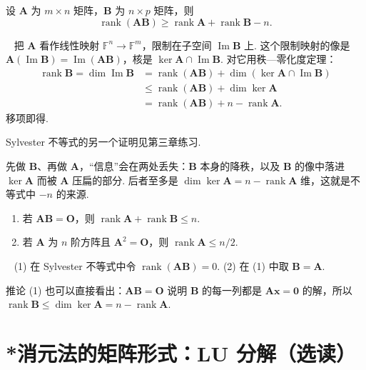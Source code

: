 \documentclass[lang=cn,10.5pt,scheme=chinese,toc=twocol,section,chinesefont=nofont,
twoside,citestyle=gb7714-2015,bibstyle=gb7714-2015]{elegantbook}
\newcommand{\vv}[1]{\boldsymbol{#1}}
\newcommand{\zero}{\boldsymbol{0}}          %
\numberwithin{equation}{section}   %
\newcommand{\rk}{\operatorname{rank}}       %
\newcommand{\imm}{\operatorname{Im}}        %
\newcommand*{\lnlabel}[1]{{\sffamily\bfseries\color{black}#1}}
\renewenvironment{proof}{%
	\par\noindent\lnlabel{\proofname}\;\ \color{black!90}\cfs}{\par}
\begin{document}
\begin{theorem}\label{thm:sylvester}
  设 $\vv A$ 为 $m\times n$ 矩阵，$\vv B$ 为 $n\times p$ 矩阵，则
  \[\rk(\vv{AB})\ge\rk\vv A+\rk\vv B-n.\]
\end{theorem}
\begin{proof}
  把 $\vv A$ 看作线性映射 $\mathbb{F}^n\to\mathbb{F}^m$，限制在子空间 $\imm\vv B$ 上. 这个限制映射的像是 $\vv A(\imm\vv B)=\imm(\vv{AB})$，核是 $\ker\vv A\cap\imm\vv B$. 对它用秩—零化度定理：
  \[
    \begin{aligned}
      \rk\vv B=\dim\imm\vv B & =\rk(\vv{AB})+\dim(\ker\vv A\cap\imm\vv B) \\
                             & \le\rk(\vv{AB})+\dim\ker\vv A              \\
                             & =\rk(\vv{AB})+n-\rk\vv A.
    \end{aligned}
  \]
  移项即得.
\end{proof}

Sylvester 不等式的另一个证明见第三章练习.

\begin{motivebox}
  先做 $\vv B$、再做 $\vv A$，“信息”会在两处丢失：$\vv B$ 本身的降秩，以及 $\vv B$ 的像中落进 $\ker\vv A$ 而被 $\vv A$ 压扁的部分. 后者至多是 $\dim\ker\vv A=n-\rk\vv A$ 维，这就是不等式中 $-n$ 的来源.
\end{motivebox}

\begin{corollary}
  \begin{enumerate}
    \item 若 $\vv{AB}=\vv O$，则 $\rk\vv A+\rk\vv B\le n$.
    \item 若 $\vv A$ 为 $n$ 阶方阵且 $\vv A^2=\vv O$，则 $\rk\vv A\le n/2$.
  \end{enumerate}
\end{corollary}
\begin{proof}
  (1) 在 Sylvester 不等式中令 $\rk(\vv{AB})=0$. (2) 在 (1) 中取 $\vv B=\vv A$.
\end{proof}

推论 (1) 也可以直接看出：$\vv{AB}=\vv O$ 说明 $\vv B$ 的每一列都是 $\vv{Ax}=\zero$ 的解，所以 $\rk\vv B\le\dim\ker\vv A=n-\rk\vv A$.

\section{*消元法的矩阵形式：LU 分解（选读）}
\end{document}
